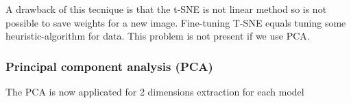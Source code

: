 \documentclass[12pt]{article} %
\begin{document}
 A drawback of this tecnique is that the t-SNE is not linear method so is not possible to save weights for a new image. Fine-tuning T-SNE equals tuning some heuristic-algorithm for data. This problem is not present if we use PCA.\\


\subsubsection {Principal component analysis (PCA)}
The PCA is now applicated for 2 dimensions extraction for each model\\

\begin{minipage}{0.5\textwidth}
\begin{figure}[H] %
 \end{figure}
\end{minipage}
\begin{minipage}{0.5\textwidth}
\begin{figure}[H] %
 \end{figure}
\end{minipage}
\end{document}
